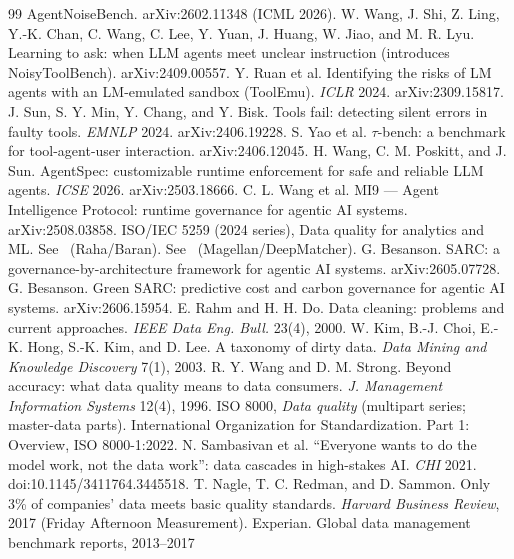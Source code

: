 \documentclass[11pt]{article}
\theoremstyle{plain}
\theoremstyle{definition}
\begin{document}
\begin{thebibliography}{99}
 AgentNoiseBench. arXiv:2602.11348 (ICML 2026).
 W. Wang, J. Shi, Z. Ling, Y.-K. Chan, C. Wang, C. Lee,
Y. Yuan, J. Huang, W. Jiao, and M. R. Lyu. Learning to ask: when LLM agents meet
unclear instruction (introduces NoisyToolBench). arXiv:2409.00557.
 Y. Ruan et al. Identifying the risks of LM agents with an
LM-emulated sandbox (ToolEmu). \emph{ICLR} 2024. arXiv:2309.15817.
 J. Sun, S. Y. Min, Y. Chang, and Y. Bisk. Tools fail:
detecting silent errors in faulty tools. \emph{EMNLP} 2024. arXiv:2406.19228.
 S. Yao et al. $\tau$-bench: a benchmark for tool-agent-user
interaction. arXiv:2406.12045.
 H. Wang, C. M. Poskitt, and J. Sun. AgentSpec: customizable
runtime enforcement for safe and reliable LLM agents. \emph{ICSE} 2026.
arXiv:2503.18666.
 C. L. Wang et al. MI9 --- Agent Intelligence Protocol: runtime
governance for agentic AI systems. arXiv:2508.03858.
 ISO/IEC 5259 (2024 series), Data quality for analytics and ML.
 See~\cite{mahdavi2019} (Raha/Baran).
 See~\cite{konda2016} (Magellan/DeepMatcher).
 G. Besanson. SARC: a governance-by-architecture framework for
agentic AI systems. arXiv:2605.07728.
 G. Besanson. Green SARC: predictive cost and carbon
governance for agentic AI systems. arXiv:2606.15954.
 E. Rahm and H. H. Do. Data cleaning: problems and current
approaches. \emph{IEEE Data Eng. Bull.} 23(4), 2000.
 W. Kim, B.-J. Choi, E.-K. Hong, S.-K. Kim, and D. Lee. A taxonomy
of dirty data. \emph{Data Mining and Knowledge Discovery} 7(1), 2003.
 R. Y. Wang and D. M. Strong. Beyond accuracy: what data
quality means to data consumers. \emph{J. Management Information Systems} 12(4), 1996.
 ISO 8000, \emph{Data quality} (multipart series; master-data
parts). International Organization for Standardization. Part 1: Overview,
ISO 8000-1:2022.
 N. Sambasivan et al. ``Everyone wants to do the model work,
not the data work'': data cascades in high-stakes AI. \emph{CHI} 2021.
doi:10.1145/3411764.3445518.
 T. Nagle, T. C. Redman, and D. Sammon. Only 3\% of companies'
data meets basic quality standards. \emph{Harvard Business Review}, 2017
(Friday Afternoon Measurement).
 Experian. Global data management benchmark reports, 2013--2017

\end{thebibliography}
\end{document}

